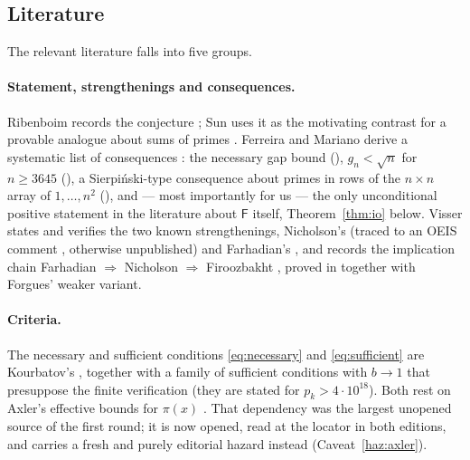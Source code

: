 \documentclass[11pt,a4paper]{article}
\theoremstyle{plain}
\theoremstyle{definition}
\theoremstyle{remark}
\newcommand{\Fb}{\mathsf{F}}
\begin{document}
\subsection{Literature}
\label{sec:lit}

The relevant literature falls into five groups.

\paragraph{Statement, strengthenings and consequences.}
Ribenboim records the conjecture \cite[p.~185]{ribenboim2004little}; Sun uses it as the
motivating contrast for a provable analogue about sums of primes
\cite[Thm.~2.1]{sun2013sequence}. Ferreira and Mariano derive a systematic list of
consequences \cite{ferreira2017consequences}: the necessary gap bound
(\cite[Thm.~2.2]{ferreira2017consequences}), $g_n < \sqrt{n}$ for $n \ge 3645$
(\cite[Lem.~3.2]{ferreira2017consequences}), a Sierpi\'nski-type consequence about primes in
rows of the $n\times n$ array of $1,\dots,n^2$ (\cite[Cons.~3.3]{ferreira2017consequences}),
and --- most importantly for us --- the only unconditional positive statement in the
literature about $\Fb$ itself, Theorem~\ref{thm:io} below. Visser
\cite{visser2019verifying} states and verifies the two known strengthenings, Nicholson's
(traced to an OEIS comment \cite{oeisA182514}, otherwise unpublished) and Farhadian's
\cite{farhadian2017new}, and records the implication chain
Farhadian $\Rightarrow$ Nicholson $\Rightarrow$ Firoozbakht
\cite[Conj.~2]{visser2019verifying}, proved in
\cite[Thm.~4.5]{ferreira2017consequences} together with Forgues' weaker variant.

\paragraph{Criteria.}
The necessary and sufficient conditions \eqref{eq:necessary} and \eqref{eq:sufficient} are
Kourbatov's \cite[\S2 Thm.~1, \S4 Thm.~3]{kourbatov2015bounds}, together with a family of
sufficient conditions with $b \to 1$ \cite[\S4, Thm.~4]{kourbatov2015bounds} that presuppose
the finite verification (they are stated for $p_k > 4\cdot10^{18}$). Both rest on Axler's
effective bounds for $\pi(x)$ \cite{axler2014newbounds}. That dependency was the largest
unopened source of the first round; it is now opened, read at the locator in both editions,
and carries a fresh and purely editorial hazard instead (Caveat~\ref{haz:axler}).
\end{document}
